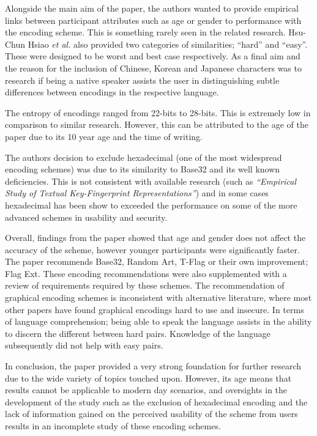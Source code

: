 Alongside the main aim of the paper, the authors wanted to provide empirical links between participant attributes such as age or gender to performance with the encoding scheme. This is something rarely seen in the related research. Hsu-Chun Hsiao \textit{et al.} also provided two categories of similarities; ``hard'' and ``easy''. These were designed to be worst and best case respectively. As a final aim and the reason for the inclusion of Chinese, Korean and Japanese characters was to research if being a native speaker assists the user in distinguishing subtle differences between encodings in the respective language.

The entropy of encodings ranged from 22-bits to 28-bits. This is extremely low in comparison to similar research. However, this can be attributed to the age of the paper due to its 10 year age and the time of writing. 

The authors decision to exclude hexadecimal (one of the most widespread encoding schemes) was due to its similarity to Base32 and its well known deficiencies. This is not consistent with available research (such as \textit{``Empirical Study of Textual Key-Fingerprint Representations''}) and in some cases hexadecimal has been show to exceeded the performance on some of the more advanced schemes in usability and security.

Overall, findings from the paper showed that age and gender does not affect the accuracy of the scheme, however younger participants were significantly faster. \\
The paper recommends Base32, Random Art, T-Flag or their own improvement; Flag Ext. These encoding recommendations were also supplemented with a review of requirements required by these schemes. The recommendation of graphical encoding schemes is inconsistent with alternative literature, where most other papers have found graphical encodings hard to use and insecure.
In terms of language comprehension; being able to speak the language assists in the ability to discern the different between hard pairs. Knowledge of the language subsequently did not help with easy pairs.

In conclusion, the paper provided a very strong foundation for further research due to the wide variety of topics touched upon. However, its age means that results cannot be applicable to modern day scenarios, and oversights in the development of the study such as the exclusion of hexadecimal encoding and the lack of information gained on the perceived usability of the scheme from users results in an incomplete study of these encoding schemes. 

